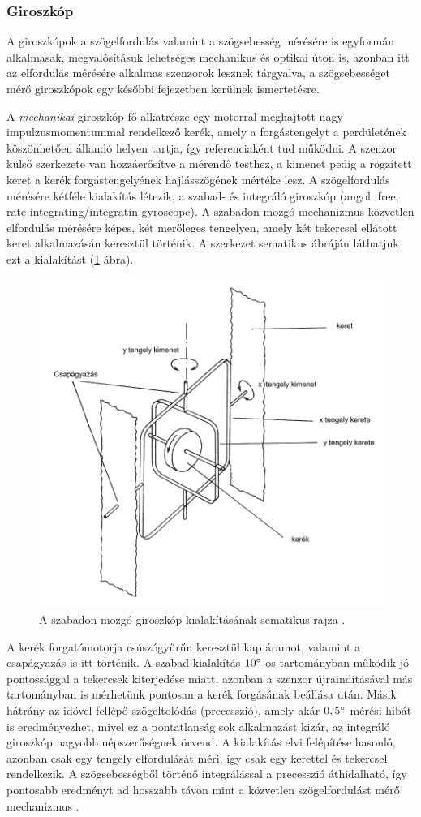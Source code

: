 \subsubsection{Giroszkóp}
\label{lingiro}

A giroszkópok a szögelfordulás valamint a szögsebesség mérésére is egyformán alkalmasak, megvalósításuk lehetséges mechanikus és optikai úton is, azonban itt az elfordulás mérésére alkalmas szenzorok lesznek tárgyalva, a szögsebességet mérő giroszkópok egy későbbi fejezetben kerülnek ismertetésre. 

A \textit{mechanikai} giroszkóp fő alkatrésze egy motorral meghajtott nagy impulzusmomentummal rendelkező kerék, amely a forgástengelyt a perdületének köszönhetően állandó helyen tartja, így referenciaként tud működni. A szenzor külső szerkezete van hozzáerősítve a mérendő testhez, a kimenet pedig a rögzített keret a kerék forgástengelyének hajlásszögének mértéke lesz. A szögelfordulás mérésére kétféle kialakítás létezik, a szabad- és integráló giroszkóp (angol: free, rate-integrating/integratin gyroscope). A szabadon mozgó mechanizmus közvetlen elfordulás mérésére képes, két merőleges tengelyen, amely két tekercsel ellátott keret alkalmazásán keresztül történik. A szerkezet sematikus ábráján láthatjuk ezt a kialakítást (\ref{freegyro} ábra). 
\begin{figure}
	\centering
	\includegraphics[width=.7\columnwidth]{figures/freegyro.png}
	\caption{A szabadon mozgó giroszkóp kialakításának sematikus rajza \cite{Morris2016b}.}
	\label{freegyro}
\end{figure}
A kerék forgatómotorja csúszógyűrűn keresztül kap áramot, valamint a csapágyazás is itt történik. A szabad kialakítás $10\degree$-os tartományban működik jó pontossággal a tekercsek kiterjedése miatt, azonban a szenzor újraindításával más tartományban is mérhetünk pontosan a kerék forgásának beállása után. Másik hátrány az idővel fellépő szögeltolódás (precesszió), amely akár $0,5\degree$ mérési hibát is eredményezhet, mivel ez a pontatlanság sok alkalmazást kizár, az integráló giroszkóp nagyobb népszerűségnek örvend. A kialakítás elvi felépítése hasonló, azonban csak egy tengely elfordulását méri, így csak egy kerettel és tekercsel rendelkezik. A szögsebességből történő integrálással a precesszió áthidalható, így pontosabb eredményt ad hosszabb távon mint a közvetlen szögelfordulást mérő mechanizmus \cite{Morris2016b}.

